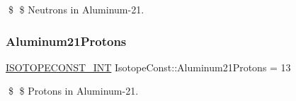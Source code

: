 \$ \$ Neutrons in Aluminum-\/21. \mbox{\label{group___isotope_const-_aluminum-_al21_gaaa551cf92d2d9ed6d1709d11570e401c}} 
\subsubsection{\texorpdfstring{Aluminum21\+Protons}{Aluminum21Protons}}
{\footnotesize\ttfamily \mbox{\hyperlink{group___isotope_const-_macros_ga5f18360b3e99483a35c32d789e62621c}{I\+S\+O\+T\+O\+P\+E\+C\+O\+N\+S\+T\+\_\+\+I\+NT}} Isotope\+Const\+::\+Aluminum21\+Protons = 13}

\$ \$ Protons in Aluminum-\/21. 